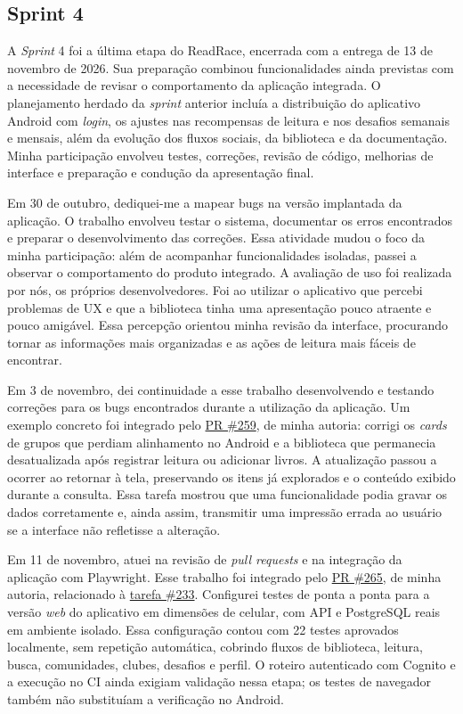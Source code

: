 \clearpage
\subsection{Sprint 4}

A \textit{Sprint} 4 foi a última etapa do ReadRace, encerrada com a entrega de 13 de novembro de 2026. Sua preparação combinou funcionalidades ainda previstas com a necessidade de revisar o comportamento da aplicação integrada. O planejamento herdado da \textit{sprint} anterior incluía a distribuição do aplicativo Android com \textit{login}, os ajustes nas recompensas de leitura e nos desafios semanais e mensais, além da evolução dos fluxos sociais, da biblioteca e da documentação. Minha participação envolveu testes, correções, revisão de código, melhorias de interface e preparação e condução da apresentação final.

Em 30 de outubro, dediquei-me a mapear bugs na versão implantada da aplicação. O trabalho envolveu testar o sistema, documentar os erros encontrados e preparar o desenvolvimento das correções. Essa atividade mudou o foco da minha participação: além de acompanhar funcionalidades isoladas, passei a observar o comportamento do produto integrado. A avaliação de uso foi realizada por nós, os próprios desenvolvedores. Foi ao utilizar o aplicativo que percebi problemas de \ac{UX} e que a biblioteca tinha uma apresentação pouco atraente e pouco amigável. Essa percepção orientou minha revisão da interface, procurando tornar as informações mais organizadas e as ações de leitura mais fáceis de encontrar.

Em 3 de novembro, dei continuidade a esse trabalho desenvolvendo e testando correções para os bugs encontrados durante a utilização da aplicação. Um exemplo concreto foi integrado pelo \href{https://github.com/ReadRace-AGES/ReadRace/pull/259}{PR \#259}, de minha autoria: corrigi os \textit{cards} de grupos que perdiam alinhamento no Android e a biblioteca que permanecia desatualizada após registrar leitura ou adicionar livros. A atualização passou a ocorrer ao retornar à tela, preservando os itens já explorados e o conteúdo exibido durante a consulta. Essa tarefa mostrou que uma funcionalidade podia gravar os dados corretamente e, ainda assim, transmitir uma impressão errada ao usuário se a interface não refletisse a alteração.

Em 11 de novembro, atuei na revisão de \textit{pull requests} e na integração da aplicação com Playwright. Esse trabalho foi integrado pelo \href{https://github.com/ReadRace-AGES/ReadRace/pull/265}{PR \#265}, de minha autoria, relacionado à \href{https://github.com/ReadRace-AGES/ReadRace/issues/233}{tarefa \#233}. Configurei testes de ponta a ponta para a versão \textit{web} do aplicativo em dimensões de celular, com \ac{API} e PostgreSQL reais em ambiente isolado. Essa configuração contou com 22 testes aprovados localmente, sem repetição automática, cobrindo fluxos de biblioteca, leitura, busca, comunidades, clubes, desafios e perfil. O roteiro autenticado com Cognito e a execução no \ac{CI} ainda exigiam validação nessa etapa; os testes de navegador também não substituíam a verificação no Android.

